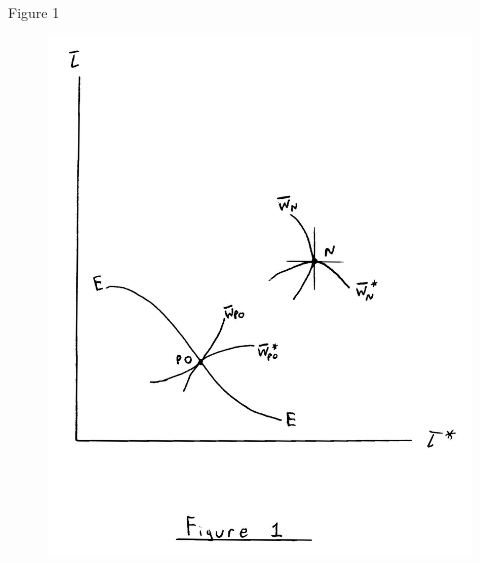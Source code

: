 \documentclass[aspectratio=169]{beamer}
\begin{document}
\begin{frame}{Figure 1}

\begin{figure}
    \centering
    \includegraphics[scale=0.4]{BagwellStaigerFig1.jpg}
    \label{fig:Fig1}
\end{figure}
    
\end{frame}

\end{document}
